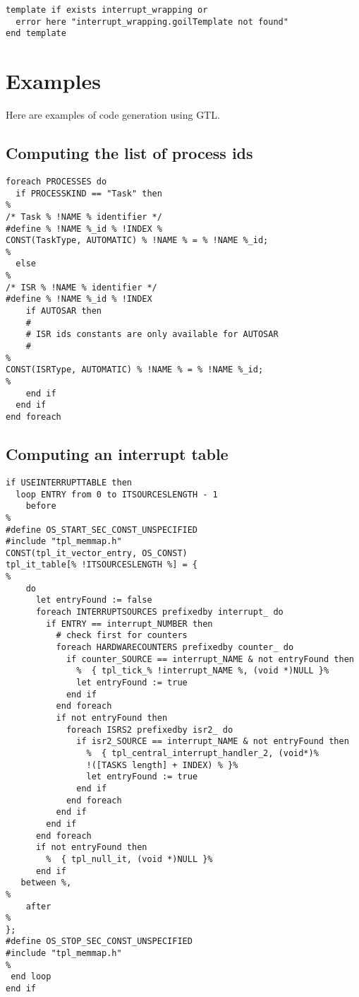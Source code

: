 \begin{lstlisting}[frame=single]
template if exists interrupt_wrapping or
  error here "interrupt_wrapping.goilTemplate not found"
end template
\end{lstlisting}

\section{Examples}

Here are examples of code generation using GTL.

\subsection{Computing the list of process ids}

\begin{lstlisting}[frame=single]
foreach PROCESSES do
  if PROCESSKIND == "Task" then
%
/* Task % !NAME % identifier */
#define % !NAME %_id % !INDEX %
CONST(TaskType, AUTOMATIC) % !NAME % = % !NAME %_id;
%
  else
%
/* ISR % !NAME % identifier */
#define % !NAME %_id % !INDEX 
    if AUTOSAR then
    #
    # ISR ids constants are only available for AUTOSAR
    #
%
CONST(ISRType, AUTOMATIC) % !NAME % = % !NAME %_id;
%
    end if
  end if
end foreach
\end{lstlisting}

\subsection{Computing an interrupt table}

\begin{lstlisting}[frame=single]
if USEINTERRUPTTABLE then
  loop ENTRY from 0 to ITSOURCESLENGTH - 1
    before
%
#define OS_START_SEC_CONST_UNSPECIFIED
#include "tpl_memmap.h"
CONST(tpl_it_vector_entry, OS_CONST)
tpl_it_table[% !ITSOURCESLENGTH %] = {
%
    do
      let entryFound := false
      foreach INTERRUPTSOURCES prefixedby interrupt_ do
        if ENTRY == interrupt_NUMBER then
          # check first for counters
          foreach HARDWARECOUNTERS prefixedby counter_ do
            if counter_SOURCE == interrupt_NAME & not entryFound then
              %  { tpl_tick_% !interrupt_NAME %, (void *)NULL }%
              let entryFound := true
            end if
          end foreach
          if not entryFound then
            foreach ISRS2 prefixedby isr2_ do
              if isr2_SOURCE == interrupt_NAME & not entryFound then
                %  { tpl_central_interrupt_handler_2, (void*)%
                !([TASKS length] + INDEX) % }%
                let entryFound := true
              end if
            end foreach
          end if
        end if
      end foreach
      if not entryFound then
        %  { tpl_null_it, (void *)NULL }%
      end if
   between %,
%
    after
%
};
#define OS_STOP_SEC_CONST_UNSPECIFIED
#include "tpl_memmap.h"
%
 end loop
end if
\end{lstlisting}

